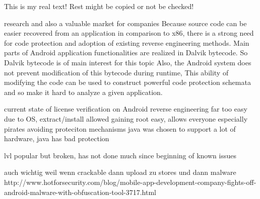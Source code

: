 This is my real text! Rest might be copied or not be checked!



%
research and also a valuable market for companies\newline
Because source code can be easier recovered from an application in comparison
to x86, there is a strong need for code protection and adoption of existing reverse engineering methods. Main parts of Android application functionalities are realized in Dalvik bytecode. So Dalvik bytecode is of main interest for this topic\newline
Also, the Android system does not prevent modification of this bytecode during runtime, This ability of modifying the code can be used to construct
powerful code protection schemata and so make it hard to analyze a given application.\newline
\cite{schulzLabCourse}
%



%
current state of license verification  on Android
reverse engineering far too easy due to OS, extract/install allowed
gaining root easy, allows everyone especially pirates avoiding proteciton mechanisms
java was chosen to support a lot of hardware, java has bad protection

lvl popular but broken, has not done much since beginning of known issues
\cite{munteanLicense}
%

auch wichtig weil wenn crackable dann upload zu stores und dann malware \newline
http://www.hotforsecurity.com/blog/mobile-app-development-company-fights-off-android-malware-with-obfuscation-tool-3717.html\newline
